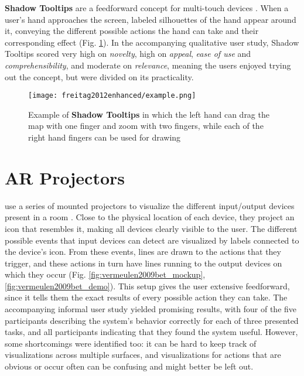 \textbf{Shadow Tooltips} are a feedforward concept for multi-touch devices \cite{freitag2012enhanced}. When a user's hand approaches the screen, labeled silhouettes of the hand appear around it, conveying the different possible actions the hand can take and their corresponding effect (Fig. \ref{fig:freitag2012enhanced_demo}). In the accompanying qualitative user study, Shadow Tooltips scored very high on \textit{novelty}, high on \textit{appeal}, \textit{ease of use} and \textit{comprehensibility}, and moderate on \textit{relevance}, meaning the users enjoyed trying out the concept, but were divided on its practicality.

\begin{figure}
    \centering
    \texttt{[image: freitag2012enhanced/example.png]}
    \caption{Example of \textbf{Shadow Tooltips} in which the left hand can drag the map with one finger and zoom with two fingers, while each of the right hand fingers can be used for drawing \cite{freitag2012enhanced}}
    \label{fig:freitag2012enhanced_demo}
\end{figure}

\section{AR Projectors} \label{sec:related_work:ar_projectors}
\textbf{\citeauthor{vermeulen2009bet}} use a series of mounted projectors to visualize the different input/output devices present in a room \cite{vermeulen2009bet}. Close to the physical location of each device, they project an icon that resembles it, making all devices clearly visible to the user. The different possible events that input devices can detect are visualized by labels connected to the device's icon. From these events, lines are drawn to the actions that they trigger, and these actions in turn have lines running to the output devices on which they occur (Fig. \ref{fig:vermeulen2009bet_mockup}, \ref{fig:vermeulen2009bet_demo}). This setup gives the user extensive feedforward, since it tells them the exact results of every possible action they can take. The accompanying informal user study yielded promising results, with four of the five participants describing the system's behavior correctly for each of three presented tasks, and all participants indicating that they found the system useful. However, some shortcomings were identified too: it can be hard to keep track of visualizations across multiple surfaces, and visualizations for actions that are obvious or occur often can be confusing and might better be left out.

